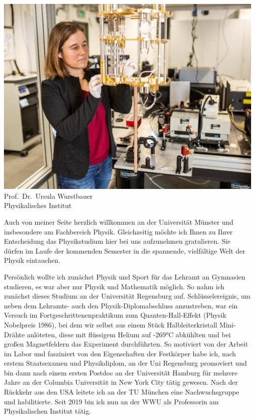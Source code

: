\begin{multicols}{2}
\begin{center}
\includegraphics[width=0.8\columnwidth]{res/vorstellungsfotos/wurstbauer.jpg}\\
\smallskip
Prof.\ Dr.\ Ursula Wurstbauer\\
Physikalisches Institut
\end{center}

Auch von meiner Seite herzlich willkommen an der Universität Münster und insbesondere am Fachbereich Physik. Gleichzeitig möchte ich Ihnen zu Ihrer Entscheidung das Physikstudium hier bei uns aufzunehmen gratulieren. Sie dürfen im Laufe der kommenden Semester in die spannende, vielfältige Welt der Physik eintauchen.

Persönlich wollte ich zunächst Physik und Sport für das Lehramt an Gymnasien studieren, es war aber nur Physik und Mathematik möglich. So nahm ich zunächst dieses Studium an der Universität Regensburg auf. Schlüsselereignis, um neben dem Lehramts- auch den Physik-Diplomabschluss anzustreben, war ein Versuch im Fortgeschrittenenpraktikum zum Quanten-Hall-Effekt (Physik Nobelpreis 1986), bei dem wir selbst aus einem Stück Halbleiterkristall Mini-Drähte anlöteten, diese mit flüssigem Helium auf -269°C abkühlten und bei großen Magnetfeldern das Experiment durchführten. So motiviert von der Arbeit im Labor und fasziniert von den Eigenschaften der Festkörper habe ich, nach erstem Staatsexamen und Physikdiplom, an der Uni Regensburg promoviert und bin dann nach einem ersten Postdoc an der Universität Hamburg für mehrere Jahre an der Columbia Universität in New York City tätig gewesen. Nach der Rückkehr aus den USA leitete ich an der TU München eine Nachwuchsgruppe und habilitierte. Seit 2019 bin ich nun an der WWU als Professorin am Physikalischen Institut tätig. 


\end{multicols}
